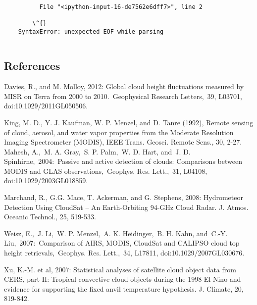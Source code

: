 \documentclass[11pt]{article}
\begin{document}
    \begin{Verbatim}[commandchars=\\\{\}]

          File "<ipython-input-16-de7562e6dff7>", line 2
        
        \^{}
    SyntaxError: unexpected EOF while parsing


    \end{Verbatim}

    \subsection{References}\label{references}

Davies, R., and M. Molloy, 2012: Global cloud height fluctuations
measured by MISR on Terra from 2000 to 2010.~Geophysical Research
Letters,~39, L03701, doi:10.1029/2011GL050506.

King, M. D., Y. J. Kaufman, W. P. Menzel, and D. Tanre (1992), Remote
sensing of cloud, aerosol, and water vapor properties from the Moderate
Resolution Imaging Spectrometer (MODIS), IEEE Trans. Geosci. Remote
Sens., 30, 2-27.\\
Mahesh, A.,~M. A. Gray,~S. P. Palm,~W. D. Hart, and~J. D.
Spinhirne,~2004:~Passive and active detection of clouds: Comparisons
between MODIS and GLAS observations,~Geophys. Res. Lett.,~31, L04108,
doi:10.1029/2003GL018859.

Marchand, R., G.G. Mace, T. Ackerman, and G. Stephens, 2008: Hydrometeor
Detection Using CloudSat -- An Earth-Orbiting 94-GHz Cloud Radar. J.
Atmos. Oceanic Technol., 25, 519-533.

Weisz, E.,~J. Li,~W. P. Menzel,~A. K. Heidinger,~B. H. Kahn, and~C.-Y.
Liu,~2007:~Comparison of AIRS, MODIS, CloudSat and CALIPSO cloud top
height retrievals,~Geophys. Res. Lett.,~34, L17811,
doi:10.1029/2007GL030676.

Xu, K.-M. et al, 2007: Statistical analyses of satellite cloud object
data from CERS, part II: Tropical convective cloud objects during the
1998 El Nino and evidence for supporting the fixed anvil temperature
hypothesis. J. Climate, 20, 819-842.


    
    
    
    
\end{document}
